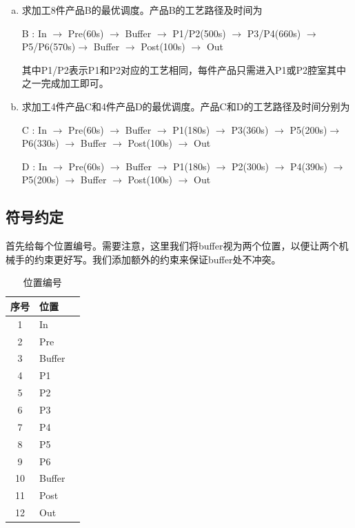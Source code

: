 \documentclass{ctexart}
\begin{document}
{{\begin{enumerate}[(a)]
{				A : In $\rightarrow$ Pre(60s) $\rightarrow$ Buffer $\rightarrow$ P1(240s) $\rightarrow$ P2(300s) $\rightarrow$ P3(360s) $\rightarrow$ P4(390s)$\rightarrow$ P5(270s) $\rightarrow$ P6(330s) $\rightarrow$ Buffer $\rightarrow$ Post(100s) $\rightarrow$ Out
				
				其中括号内为对应腔室所需的加工时间，Pre(60s) 表示自产品放入到Pre至允许取出需消耗60s时间。}
			\item {求加工8件产品B的最优调度。产品B的工艺路径及时间为
				
				B : In $\rightarrow$ Pre(60s) $\rightarrow$ Buffer $\rightarrow$ P1/P2(500s) $\rightarrow$ P3/P4(660s) $\rightarrow$ P5/P6(570s)$\rightarrow$ Buffer $\rightarrow$ Post(100s) $\rightarrow$ Out
				
				其中P1/P2表示P1和P2对应的工艺相同，每件产品只需进入P1或P2腔室其中之一完成加工即可。}
			\item {求加工4件产品C和4件产品D的最优调度。产品C和D的工艺路径及时间分别为
				
				C : In $\rightarrow$ Pre(60s) $\rightarrow$ Buffer $\rightarrow$ P1(180s) $\rightarrow$ P3(360s) $\rightarrow$ P5(200s)$\rightarrow$ P6(330s) $\rightarrow$ Buffer $\rightarrow$ Post(100s) $\rightarrow$ Out 
				
				D : In $\rightarrow$ Pre(60s) $\rightarrow$ Buffer $\rightarrow$ P1(180s) $\rightarrow$ P2(300s) $\rightarrow$ P4(390s) $\rightarrow$ P5(200s) $\rightarrow$ Buffer $\rightarrow$ Post(100s) $\rightarrow$ Out}
		\end{enumerate}

    }

    \subsection{符号约定}
    {
        
        首先给每个位置编号。需要注意，这里我们将buffer视为两个位置，以便让两个机械手的约束更好写。我们添加额外的约束来保证buffer处不冲突。
        \begin{table}[H]
        \centering
        \caption{位置编号}
        \begin{tabular}{@{}clc@{}}
        \toprule
        序号 & 位置 \\ \midrule
        1 & In  \\
        2 & Pre  \\
        3 & Buffer  \\
        4 & P1  \\
        5 & P2  \\
        6 & P3  \\
        7 & P4  \\
        8 & P5  \\
        9 & P6  \\
        10 & Buffer \\
        11 & Post  \\
        12 & Out  \\ \bottomrule
        \end{tabular}
        \end{table}

}}
\end{document}
